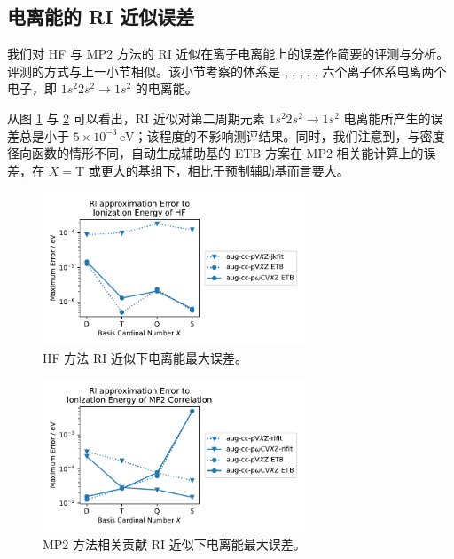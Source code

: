 \subsection{电离能的 RI 近似误差}

我们对 HF 与 MP2 方法的 RI 近似在离子电离能上的误差作简要的评测与分析。评测的方式与上一小节相似。该小节考察的体系是 , , , , ,  六个离子体系电离两个电子，即 $1s^2 2s^2 \rightarrow 1s^2$ 的电离能。

从图 \ref{fig.4.HF-RI-eng} 与 \ref{fig.4.MP2-RI-eng} 可以看出，RI 近似对第二周期元素 $1s^2 2s^2 \rightarrow 1s^2$ 电离能所产生的误差总是小于 $5 \times 10^{-3} \, \text{eV}$；该程度的不影响测评结果。同时，我们注意到，与密度径向函数的情形不同，自动生成辅助基的 ETB 方案在 MP2 相关能计算上的误差，在 $X=\mathrm{T}$ 或更大的基组下，相比于预制辅助基而言要大。

\begin{figure}[t]
    \centering
    \includegraphics[width=0.7\textwidth]{assets/HF-RI-eng.pdf}
    \caption[HF 方法 RI 近似下电离能最大误差]{HF 方法 RI 近似下电离能最大误差。}
    \label{fig.4.HF-RI-eng}
\end{figure}

\begin{figure}[t]
    \centering
    \includegraphics[width=0.7\textwidth]{assets/MP2-RI-eng.pdf}
    \caption[MP2 方法相关贡献 RI 近似下电离能最大误差]{MP2 方法相关贡献 RI 近似下电离能最大误差。}
    \label{fig.4.MP2-RI-eng}
\end{figure}

